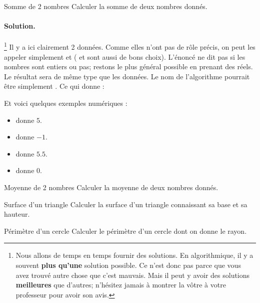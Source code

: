 		\begin{Exercice}{Somme de 2 nombres}
			Calculer la somme de deux nombres donnés.
			\paragraph{Solution.}%
			\footnote{%
				Nous allons de temps en temps 
				fournir des solutions.
				En algorithmique,
				il y a souvent \textbf{plus qu'une} solution possible.
				Ce n'est donc pas parce que vous avez trouvé autre chose
				que c'est mauvais.
				Mais il peut y avoir des solutions \textbf{meilleures}
				que d'autres; 
				n'hésitez jamais à montrer la vôtre
				à votre professeur pour avoir son avis.
			}
			Il y a ici clairement 2 données.
			Comme elles n'ont pas de rôle précis,
			on peut les appeler simplement 
			et 
			( et  sont aussi de bons choix).
			L'énoncé ne dit pas si les nombres sont entiers ou pas;
			restons le plus général possible en prenant des réels.
			Le résultat sera de même type que les données.
			Le nom de l'algorithme pourrait être simplement .
			Ce qui donne :
			\begin{center}
			\end{center}			 
			Et voici quelques exemples numériques :			
			\begin{multicols}{2}
				\begin{itemize}
				\item {} donne $5$.
				\item {} donne $-1$.
				\item {} donne $5.5$.
				\item {} donne $0$.
				\end{itemize}
			\end{multicols}			
		\end{Exercice}
	
		\begin{Exercice}{Moyenne de 2 nombres}
			Calculer la moyenne de deux nombres donnés.
		\end{Exercice}
		
		\begin{Exercice}{Surface d’un triangle}
			Calculer la surface d’un triangle connaissant sa base et sa hauteur.
		\end{Exercice}
	
		\begin{Exercice}{Périmètre d’un cercle}
			Calculer le périmètre d’un cercle dont on donne le rayon. 
		\end{Exercice}
	
